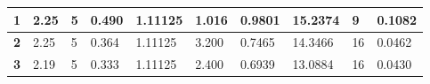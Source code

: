 \begin{table}[h]
{\begin{tabular}{|l|l|l|l|l|l|l|l|l|l|}
\textbf{1}                               & 2.25                                                                                     & 5                                                                                                    & 0.490                                                                                                    & 1.11125                                                                                                 & 1.016                                                                                           & 0.9801                                                                                            & 15.2374                                                                                           & 9                                                                                    & 0.1082                                                                                     \\ \hline
\textbf{2}                               & 2.25                                                                                     & 5                                                                                                    & 0.364                                                                                                    & 1.11125                                                                                                 & 3.200                                                                                           & 0.7465                                                                                            & 14.3466                                                                                           & 16                                                                                    & 0.0462
\\ \hline
\textbf{3}                               & 2.19                                                                                     & 5                                                                                                    & 0.333                                                                                                    & 1.11125                                                                                                 & 2.400                                                                                           & 0.6939                                                                                            & 13.0884                                                                                           & 16                                                                                    & 0.0430                                                                                     \\ \hline

\end{tabular}}
\end{table}
